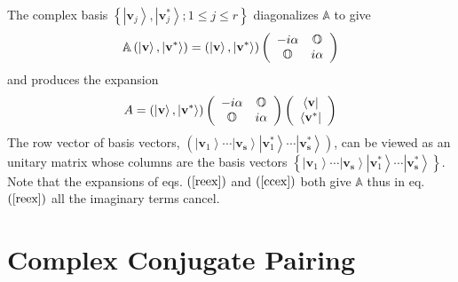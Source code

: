 \documentclass[aps,preprint]{revtex4}%
\begin{document}
The complex basis $\left\{  \left\vert \mathbf{v}_{j}\right\rangle ,\left\vert
\mathbf{v}_{j}^{\ast}\right\rangle ;1\leq j\leq r\right\}  $ diagonalizes
$\mathbb{A}$ to give
\begin{equation}
\mathbb{A}\left(  \left\vert \mathbf{v}\right\rangle ,\left\vert
\mathbf{v}^{\ast}\right\rangle \right)  =\left(  \left\vert \mathbf{v}%
\right\rangle ,\left\vert \mathbf{v}^{\ast}\right\rangle \right)  \left(
\begin{array}
[c]{cc}%
-i\mathbf{\alpha} & \mathbb{O}\\
\mathbb{O} & i\mathbf{\alpha}%
\end{array}
\right)
\end{equation}
and produces the expansion%
\begin{equation}
A=\left(  \left\vert \mathbf{v}\right\rangle ,\left\vert \mathbf{v}^{\ast
}\right\rangle \right)  \left(
\begin{array}
[c]{cc}%
-i\mathbf{\alpha} & \mathbb{O}\\
\mathbb{O} & i\mathbf{\alpha}%
\end{array}
\right)  \left(
\begin{array}
[c]{c}%
\left\langle \mathbf{v}\right\vert \\
\left\langle \mathbf{v}^{\ast}\right\vert
\end{array}
\right)  \label{ccex}%
\end{equation}
The row vector of basis vectors, $\left(  \left\vert \mathbf{v}_{1}%
\right\rangle \cdots\left\vert \mathbf{v}_{\mathbf{s}}\right\rangle \left\vert
\mathbf{v}_{1}^{\ast}\right\rangle \cdots\left\vert \mathbf{v}_{\mathbf{s}%
}^{\ast}\right\rangle \right)  $, can be viewed as an unitary matrix whose
columns are the basis vectors $\left\{  \left\vert \mathbf{v}_{1}\right\rangle
\cdots\left\vert \mathbf{v}_{\mathbf{s}}\right\rangle \left\vert
\mathbf{v}_{1}^{\ast}\right\rangle \cdots\left\vert \mathbf{v}_{\mathbf{s}%
}^{\ast}\right\rangle \right\}  $. Note that the expansions of eqs. $\left(
\ref{reex}\right)  $ and $\left(  \ref{ccex}\right)  $ both give $\mathbb{A}$
thus in eq. $\left(  \ref{reex}\right)  $ all the imaginary terms cancel.

\section{Complex Conjugate Pairing\label{pairing}}
\end{document}
